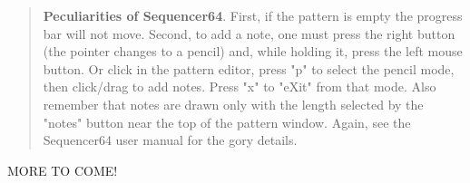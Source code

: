    \begin{quotation}
      \textbf{Peculiarities of Sequencer64}.
      First, if the pattern is empty the
      progress bar will not move.  Second, to add a note, one must press
      the right button (the pointer changes to a pencil) and, while holding
      it, press the left mouse button.  Or click in the pattern editor, press
      "p" to select the pencil mode, then click/drag to add notes.  Press "x"
      to "eXit" from that mode.  Also remember that notes are drawn only with
      the length selected by the "notes" button near the top of the pattern
      window.  Again, see the Sequencer64 user manual for the gory details.
   \end{quotation}

   MORE TO COME!

